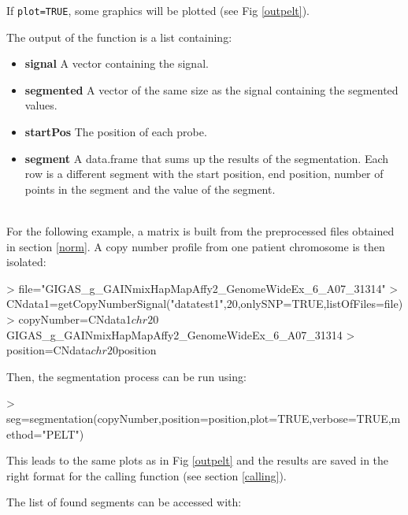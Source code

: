 \documentclass[a4paper,10pt]{article}
\begin{document}
		If \texttt{plot=TRUE}, some graphics will be plotted (see Fig \ref{outpelt}).
	
		
		The output of the function is a list containing:
		\begin{itemize}
			\item \textbf{signal} A vector containing the signal.
			\item \textbf{segmented} A vector of the same size as the signal containing the segmented values.
			\item \textbf{startPos} The position of each probe.
			\item \textbf{segment} A data.frame that sums up the results of the segmentation. Each row is a different segment with the start position, end position, number of points in the segment and the value of the segment.
		\end{itemize}

		~~\\
	
		For the following example, a matrix is built from the preprocessed files obtained in section \ref{norm}. A copy number profile from one patient chromosome is then isolated: 
	
\begin{Schunk}
\begin{Sinput}
> file="GIGAS_g_GAINmixHapMapAffy2_GenomeWideEx_6_A07_31314"
> CNdata1=getCopyNumberSignal("datatest1",20,onlySNP=TRUE,listOfFiles=file)
> copyNumber=CNdata1$chr20$GIGAS_g_GAINmixHapMapAffy2_GenomeWideEx_6_A07_31314
> position=CNdata$chr20$position
\end{Sinput}
\end{Schunk}
	
		Then, the segmentation process can be run using:
\begin{Schunk}
\begin{Sinput}
> seg=segmentation(copyNumber,position=position,plot=TRUE,verbose=TRUE,method="PELT")
\end{Sinput}
\end{Schunk}
	
		This leads to the same plots as in Fig \ref{outpelt} and the results are saved in the right format for the calling function (see section \ref{calling}).
	
		The list of found segments can be accessed with: 
\begin{Schunk}
\end{Schunk}
	
\end{document}
